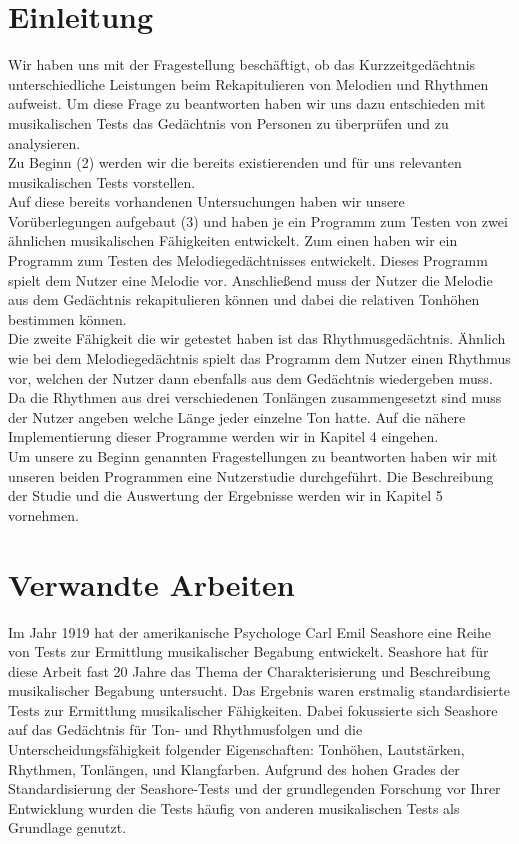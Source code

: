 \documentclass{acm_proc_article-sp}
\begin{document}
\section{Einleitung}
Wir haben uns mit der Fragestellung beschäftigt, ob das Kurzzeitgedächtnis unterschiedliche Leistungen beim Rekapitulieren von Melodien und Rhythmen aufweist. Um diese Frage zu beantworten haben wir uns dazu entschieden mit musikalischen Tests das Gedächtnis von Personen zu überprüfen und zu analysieren.\\
Zu Beginn (2) werden wir die bereits existierenden und für uns relevanten musikalischen Tests vorstellen.\\
Auf diese bereits vorhandenen Untersuchungen haben wir unsere Vorüberlegungen aufgebaut (3) und haben je ein Programm zum Testen von zwei ähnlichen musikalischen Fähigkeiten entwickelt. Zum einen haben wir ein Programm zum Testen des Melodiegedächtnisses entwickelt. Dieses Programm spielt dem Nutzer eine Melodie vor. Anschließend muss der Nutzer die Melodie aus dem Gedächtnis rekapitulieren können und dabei die relativen Tonhöhen bestimmen können.\\
Die zweite Fähigkeit die wir getestet haben ist das Rhythmusgedächtnis. Ähnlich wie bei dem Melodiegedächtnis spielt das Programm dem Nutzer einen Rhythmus vor, welchen der Nutzer dann ebenfalls aus dem Gedächtnis wiedergeben muss. Da die Rhythmen aus drei verschiedenen Tonlängen zusammengesetzt sind muss der Nutzer angeben welche Länge jeder einzelne Ton hatte. Auf die nähere Implementierung dieser Programme werden wir in Kapitel 4 eingehen.\\
Um unsere zu Beginn genannten Fragestellungen zu beantworten haben wir mit unseren beiden Programmen eine Nutzerstudie durchgeführt. Die Beschreibung der Studie und die Auswertung der Ergebnisse werden wir in Kapitel 5 vornehmen.

\section{Verwandte Arbeiten}
Im Jahr 1919 hat der amerikanische Psychologe Carl Emil Seashore eine Reihe von Tests zur Ermittlung musikalischer Begabung entwickelt\cite{gordon:2000}. Seashore hat für diese Arbeit fast 20 Jahre das Thema der Charakterisierung und Beschreibung musikalischer Begabung untersucht. Das Ergebnis waren erstmalig standardisierte Tests zur Ermittlung musikalischer Fähigkeiten. Dabei fokussierte sich Seashore auf das Gedächtnis für Ton- und Rhythmusfolgen und die Unterscheidungsfähigkeit folgender Eigenschaften: Tonhöhen, Lautstärken, Rhythmen, Tonlängen, und Klangfarben.
Aufgrund des hohen Grades der Standardisierung der Seashore-Tests und der grundlegenden Forschung vor Ihrer Entwicklung wurden die Tests häufig von anderen musikalischen Tests als Grundlage genutzt.
\end{document}
